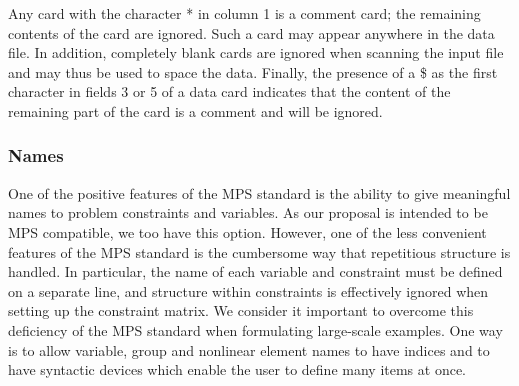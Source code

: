 \documentclass[a4paper]{article}
\begin{document}
Any card with  the  character * in  column   1 is a comment card;
the remaining contents of the card are ignored. Such a  card may appear
anywhere  in the data  file.  In addition,  completely blank
cards are
ignored when scanning the input file and may thus be used to space the
data.  Finally, the presence of a \$
as the first character in fields 3 or 5 of  a data card
indicates  that the  content  of  the remaining part  of the card is a
comment and will be ignored.

\subsubsection{\label{S2.1.1}Names}

One of the  positive features of the  MPS standard  is the  ability to
give  meaningful  names to problem constraints
and  variables.
As  our proposal  is intended to  be  MPS
compatible,   we too have  this  option.    However,  one of  the less
convenient features of  the MPS
standard  is the  cumbersome way that
repetitious  structure
is handled.   In particular,  the  name of each
variable
and  constraint
must be  defined  on a  separate  line,  and
structure within constraints  is effectively  ignored when setting  up
the  constraint matrix.   We  consider it important  to overcome  this
deficiency of the MPS
standard when formulating large-scale  examples.  One way  is to allow
variable, group
and  nonlinear element names
to have  indices and  to
have syntactic devices which enable  the user to define  many items at
once.
\end{document}
